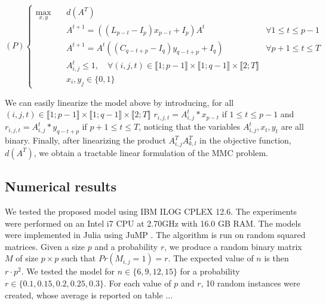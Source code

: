 \begin{equation*}
(P)\left\{
\begin{array}{lll}
\max\limits_{x,y}  \quad	& d(A^T)  \\
& A^{t+1}= ((L_{p-t}-I_p)x_{p-t}+I_p)A^t \qquad & \forall 1\le t\le p-1\\
& A^{t+1}= A^t((C_{q-t+p}-I_q)y_{q-t+p}+I_q) \qquad & \forall p+1\le t\le T\\
& A^t_{i,j} \le 1, \quad \forall (i,j,t) \in \llbracket 1; p-1 \rrbracket \times \llbracket 1; q-1 \rrbracket \times \llbracket 2; T \rrbracket \\
& x_i,y_j \in \{0,1\}
\end{array}\right.
\end{equation*}

\noindent We can easily linearize the model above by introducing, for all $(i,j,t) \in \llbracket 1; p-1 \rrbracket \times \llbracket 1; q-1 \rrbracket \times \llbracket 2; T \rrbracket $ $r_{i,j,t}=A^t_{i,j}*x_{p-t}$ if $1\le t\le p-1$ and $r_{i,j,t}=A^t_{i,j}*y_{q-t+p}$ if $p+1\le t\le T$, noticing that the variables $A^t_{i,j},x_t,y_t$ are all binary. Finally, after linearizing the product $A^T_{i,j}A^T_{k,l}$ in the objective function, $d(A^T)$, we obtain a tractable linear formulation of the MMC problem.



\subsection{Numerical results}

We tested the proposed model  using IBM ILOG CPLEX 12.6. The experiments were performed on an Intel i7 CPU at 2.70GHz with 16.0 GB RAM. The models were implemented in Julia using JuMP \cite{jump} . The algorithm is run on random squared matrices. Given a size $p$ and a probability $r$, we produce a random binary matrix $M$ of size $p \times p$ such that $Pr(M_{i,j} = 1) = r$. The expected value of $n$ is then $r \cdot p^2$. We tested the model for $n \in \{6,9,12,15\}$ for a probability $r \in \{0.1,0.15,0.2,0.25,0.3\}$. For each value of $p$ and $r$, 10 random instances were created, whose average is reported on table ...
